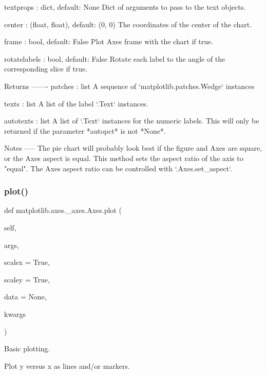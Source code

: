 \begin{DoxyVerb}
\begin{DoxyVerb}
textprops : dict, default: None
    Dict of arguments to pass to the text objects.

center : (float, float), default: (0, 0)
    The coordinates of the center of the chart.

frame : bool, default: False
    Plot Axes frame with the chart if true.

rotatelabels : bool, default: False
    Rotate each label to the angle of the corresponding slice if true.

Returns
-------
patches : list
    A sequence of `matplotlib.patches.Wedge` instances

texts : list
    A list of the label `.Text` instances.

autotexts : list
    A list of `.Text` instances for the numeric labels. This will only
    be returned if the parameter *autopct* is not *None*.

Notes
-----
The pie chart will probably look best if the figure and Axes are
square, or the Axes aspect is equal.
This method sets the aspect ratio of the axis to "equal".
The Axes aspect ratio can be controlled with `.Axes.set_aspect`.
\end{DoxyVerb}
 \mbox{\label{classmatplotlib_1_1axes_1_1__axes_1_1Axes_ad11333c8460b3a25caa912de1f7e7968}} 
\subsubsection{\texorpdfstring{plot()}{plot()}}
{\footnotesize\ttfamily def matplotlib.\+axes.\+\_\+axes.\+Axes.\+plot (\begin{DoxyParamCaption}\item[{}]{self,  }\item[{}]{args,  }\item[{}]{scalex = {\ttfamily True},  }\item[{}]{scaley = {\ttfamily True},  }\item[{}]{data = {\ttfamily None},  }\item[{}]{kwargs }\end{DoxyParamCaption})}



Basic plotting. 

\begin{DoxyVerb}Plot y versus x as lines and/or markers.


\end{DoxyVerb}
\end{DoxyVerb}
